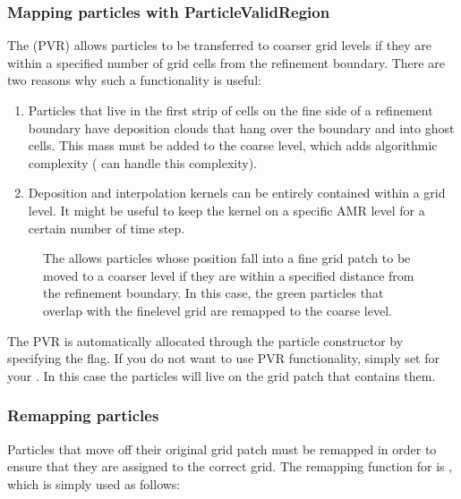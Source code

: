 \documentclass[letterpaper,10pt,english]{sphinxmanual}
\let\sphinxpxdimen\pdfpxdimen\else\newdimen\sphinxpxdimen
\begin{document}
\subsubsection{Mapping particles with ParticleValidRegion}
\label{\detokenize{Source/Particles:mapping-particles-with-particlevalidregion}}
The  (PVR) allows particles to be transferred to coarser grid levels if they are within a specified number of grid cells from the refinement boundary.
There are two reasons why such a functionality is useful:
\begin{enumerate}
%
\item {} 
Particles that live in the first strip of cells on the fine side of a refinement boundary have deposition clouds that hang over the boundary and into ghost cells.
This mass must be added to the coarse level, which adds algorithmic complexity ( can handle this complexity).

\item {} 
Deposition and interpolation kernels can be entirely contained within a grid level.
It might be useful to keep the kernel on a specific AMR level for a certain number of time step.

\end{enumerate}

\begin{figure}[htb]
\centering
\capstart

\noindent\sphinxincludegraphics[width=360\sphinxpxdimen]{{ParticleValidRegion}.png}
\caption{The  allows particles whose position fall into a fine grid patch to be moved to a coarser level if they are within a specified distance from the refinement boundary.
In this case, the green particles that overlap with the fine\sphinxhyphen{}level grid are remapped to the coarse level.}\label{\detokenize{Source/Particles:id1}}\end{figure}

The PVR is automatically allocated through the particle constructor by specifying the  flag.
If you do not want to use PVR functionality, simply set  for your .
In this case the particles will live on the grid patch that contains them.


\subsubsection{Remapping particles}
\label{\detokenize{Source/Particles:remapping-particles}}
Particles that move off their original grid patch must be remapped in order to ensure that they are assigned to the correct grid.
The remapping function for  is , which is simply used as follows:
\end{document}
